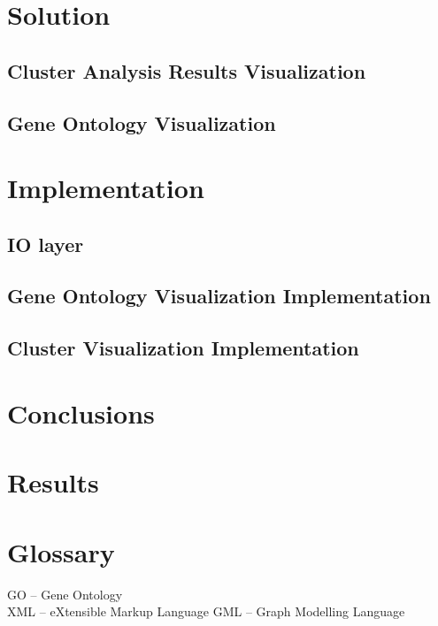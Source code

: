 \documentclass[a4paper,oneside]{article}
\begin{document}
\section{Solution}

\subsection{Cluster Analysis Results Visualization}

\subsection{Gene Ontology Visualization}

\section{Implementation}
\subsection{IO layer}
\subsection{Gene Ontology Visualization Implementation}
\subsection{Cluster Visualization Implementation}
	
\section{Conclusions}
\section{Results}

\section{Glossary}
GO -- Gene Ontology\\
XML -- eXtensible Markup Language
GML -- Graph Modelling Language
\end{document}
